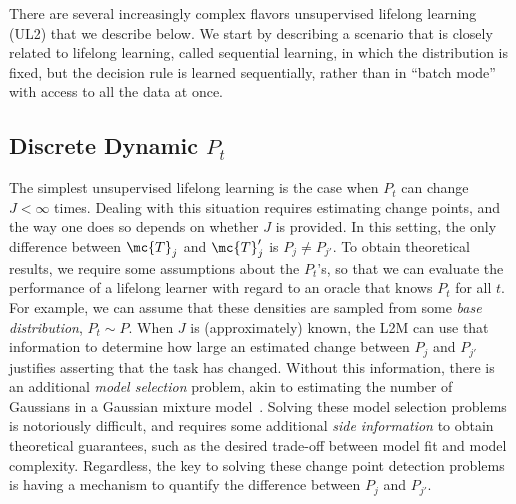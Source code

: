 \documentclass{article}
\begin{document}
There are several increasingly complex flavors unsupervised lifelong learning (UL2) that we describe below.  We start by describing a scenario that is closely related to lifelong learning, called sequential learning, in which the distribution is fixed, but the decision rule is learned sequentially, rather than in ``batch mode'' with access to all the data at once. 










\subsection{Discrete  Dynamic $P_t$}
\label{sec:jumps}

The simplest unsupervised lifelong learning   is the case when $P_t$ can change $J < \infty$ times.  Dealing with this situation requires estimating change points, and the way one does so depends on whether $J$ is provided. 
In this setting,  the only difference between $\mc{T}_j$ and $\mc{T}_j'$ is $P_j \neq P_{j'}$.
To obtain theoretical results, we require some assumptions about the $P_t$'s, so that we can evaluate the performance of a lifelong learner with regard to an oracle that knows $P_t$ for all $t$.  For example, we can assume that these densities are sampled from some \emph{base distribution}, $P_t \sim P$. When $J$ is (approximately) known, the L2M can use that information to determine how large an estimated change between $P_j$ and $P_{j'}$ justifies asserting that the task has changed.  Without this information, there is an additional \emph{model selection} problem, akin to estimating the number of Gaussians in a Gaussian mixture model~\cite{Fraley2002-rm}.  Solving these model selection problems is notoriously difficult, and requires some additional \emph{side information} to obtain theoretical guarantees, such as the desired trade-off between model fit and model complexity.  Regardless, the key to solving these change point detection problems is having a mechanism to quantify the difference between $P_j$ and $P_{j'}$. 
\end{document}
